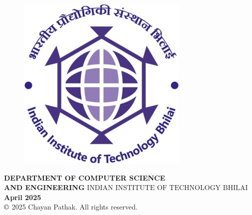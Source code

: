 \begin{center}
\begin{figure}[h]
	    \includegraphics[trim=0 0 0 0, clip, scale = 0.3] {1_front_matter/fig/iitbhlogo}
    \end{figure}
	\begin{Spacing}{1.5}
	    \textbf{ DEPARTMENT OF COMPUTER SCIENCE \\AND ENGINEERING}
	    \textbf{ $\mbox{INDIAN INSTITUTE OF TECHNOLOGY BHILAI}$}\\
	    \textbf{ April 2025}\\
		$\copyright $ 2025 Chayan Pathak. All rights reserved.
   	\end{Spacing}
\end{center}

\cleardoublepage